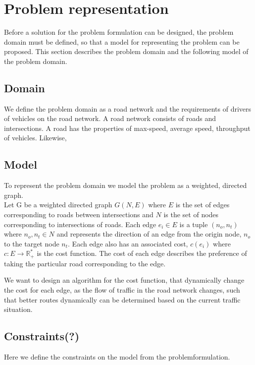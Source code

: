 \section{Problem representation}
Before a solution for the problem formulation can be designed, the problem domain must be defined, so that a model for representing the problem can be proposed. This section describes the problem domain and the following model of the problem domain.

\subsection*{Domain}
We define the problem domain as a road network and the requirements of drivers of vehicles on the road network. A road network consists of roads and intersections. A road has the properties of max-speed, average speed, throughput of vehicles. Likewise, 



\subsection*{Model}
To represent the problem domain we model the problem as a weighted, directed graph. \\
Let G be a weighted directed graph $G(N,E)$ where $E$ is the set of edges corresponding to roads between intersections and $N$ is the set of nodes corresponding to intersections of roads. Each edge $e_i \in E$ is a tuple $(n_o, n_t)$ where $n_o, n_t \in N$ and represents the direction of an edge from the origin node, $n_o$ to the target node $n_t$. Each edge also has an associated cost, $c(e_i)$ where  $c: E \rightarrow \mathbb R_+^*$ is the cost function. The cost of each edge describes the preference of taking the particular road corresponding to the edge. 

We want to design an algorithm for the cost function, that dynamically change the cost for each edge, as the flow of traffic in the road network changes, such that better routes dynamically can be determined based on the current traffic situation.

\subsection*{Constraints(?)}
Here we define the constraints on the model from the problemformulation.